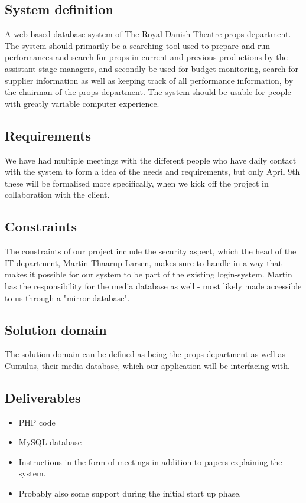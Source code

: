 \documentclass[12pt]{article}
\begin{document}
\subsection{System definition}
A web-based database-system of The Royal Danish Theatre props department. The system should primarily be a searching tool used to prepare and run performances and search for props in current and previous productions by the assistant stage managers, and secondly be used for budget monitoring, search for supplier information as well as keeping track of all performance information, by the chairman of the props department. The system should be usable for people with greatly variable computer experience.
\subsection{Requirements}
We have had multiple meetings with the different people who have daily contact with the system to form a idea of the needs and requirements, but only April 9th these will be formalised more specifically, when we kick off the project in collaboration with the client.
\subsection{Constraints}
The constraints of our project include the security aspect, which the head of the IT-department, Martin Thaarup Larsen, makes sure to handle in a way that makes it possible for our system to be part of the existing login-system. Martin has the responsibility for the media database as well - most likely made accessible to us through a "mirror database".   
\subsection{Solution domain}
The solution domain can be defined as being the props department as well as Cumulus, their media database, which our application will be interfacing with.
\subsection{Deliverables}
\begin{itemize}
  \item PHP code \\
  \item MySQL database \\
  \item Instructions in the form of meetings in addition to papers explaining the system.\\
  \item Probably also some support during the initial start up phase.
\end{itemize}
\end{document}
